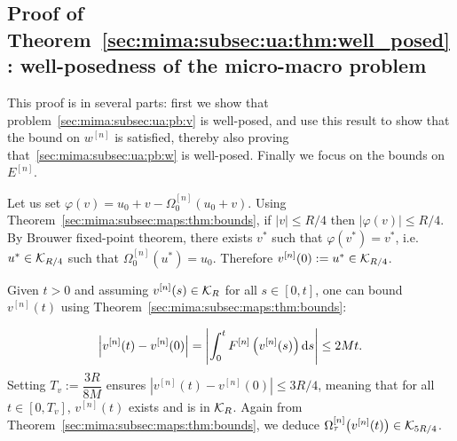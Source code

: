 \subsection{Proof of Theorem~\ref{sec:mima:subsec:ua:thm:well_posed}:
well-posedness of the micro-macro problem}
\label{sec:proofs:subsec:well_posed}

This proof is in several parts: first we show that
problem~\eqref{sec:mima:subsec:ua:pb:v} is well-posed, and use this result
to show that the bound on $w^{[n]}$ is satisfied, thereby also proving
that~\eqref{sec:mima:subsec:ua:pb:w} is well-posed. Finally we focus on
the bounds on $E^{[n]}$. 

Let us set $\varphi(v) = u_0 + v - \Omega^{[n]}_0(u_0 + v)$. Using
Theorem~\ref{sec:mima:subsec:maps:thm:bounds}, if $|v| \leq R/4$ then
$|\varphi(v)| \leq R/4$. By Brouwer fixed-point theorem, there exists
$v^*$ such that $\varphi(v^*) = v^*$, i.e. $u^* \in \mathcal{K}_{R/4}$ such that
$\Omega^{[n]}_0(u^*) = u_0$. Therefore $v^{[n]}(0) := u^* \in \mathcal{K}_{R/4}$. 

Given $t > 0$ and assuming $v^{[n]}(s) \in \mathcal{K}_{R}$ for all $s \in [0,t]$,
one can bound $v^{[n]}(t)$ using
Theorem~\ref{sec:mima:subsec:maps:thm:bounds}:

$$ \left| v^{[n]}(t) - v^{[n]}(0) \right| = \left| \int_0^{t}
F^{[n]}\left(v^{[n]}(s) \right) \mathrm{d} s \right| \leq 2Mt . $$ Setting $T_v :=
\dfrac{3R}{8M}$ ensures $\left| v^{[n]}(t) - v^{[n]}(0) \right| \leq
3R/4$, meaning that for all $t\in [0,T_v]$, $v^{[n]}(t)$ exists and is in
$\mathcal{K}_{R}$. Again from Theorem~\ref{sec:mima:subsec:maps:thm:bounds}, we
deduce $\Omega_{\tau}^{[n]} \big( v^{[n]}(t) \big) \in \mathcal{K}_{5R/4}$.

